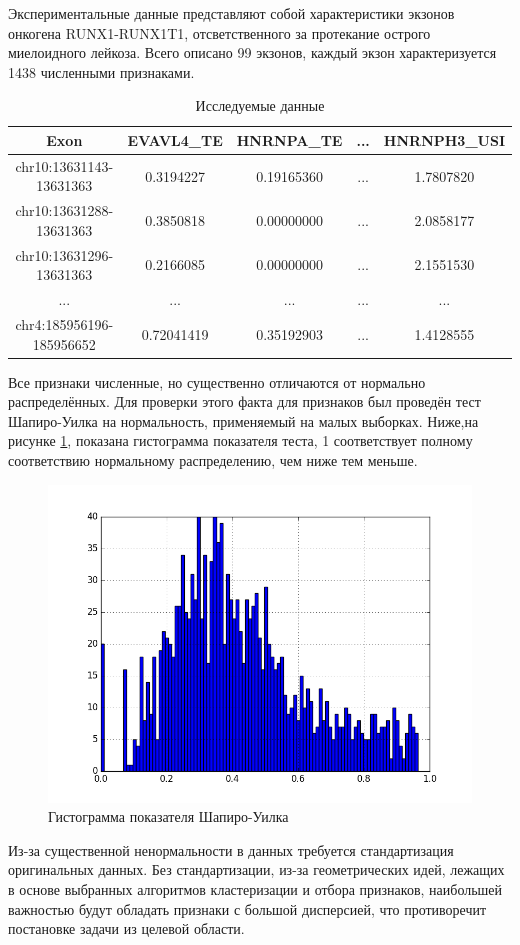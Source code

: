 Экспериментальные данные представляют собой характеристики экзонов онкогена RUNX1-RUNX1T1, отсветственного за протекание острого миелоидного лейкоза. Всего описано 99 экзонов, каждый экзон характеризуется 1438 численными признаками. 
\begin{table}[h]
\center
							\begin{tabular}{|c|c|c|c|c|}
							\hline
							Exon & EVAVL4\_TE & HNRNPA\_TE & ... & HNRNPH3\_USI \\ \hline
							chr10:13631143-13631363 & 0.3194227 & 0.19165360 & ... & 1.7807820 \\ \hline
							chr10:13631288-13631363 & 0.3850818 & 0.00000000 & ... & 2.0858177 \\ \hline
							chr10:13631296-13631363 & 0.2166085 & 0.00000000 & ... & 2.1551530 \\ \hline
							... & ... & ... & ... & ... \\ \hline
							chr4:185956196-185956652 & 0.72041419 & 0.35192903 & ... & 1.4128555 \\ \hline
						\end{tabular}
\caption{Исследуемые данные}
\end{table}

Все признаки численные, но существенно отличаются от нормально распределённых. Для проверки этого факта для признаков был проведён тест Шапиро-Уилка на нормальность, применяемый на малых выборках. Ниже,на рисунке \ref{normality_experimental}, показана гистограмма показателя теста, 1 соответствует полному соответствию нормальному распределению, чем ниже тем меньше.
\begin{figure}[h]
	\center
  \includegraphics[width=0.75\linewidth]{pics/shapiro_experimental.png}
  \caption{Гистограмма показателя Шапиро-Уилка}
  \label{normality_experimental}
\end{figure}

Из-за существенной ненормальности в данных требуется стандартизация оригинальных данных. Без стандартизации, из-за геометрических идей, лежащих в основе выбранных алгоритмов кластеризации и отбора признаков, наибольшей важностью будут обладать признаки с большой дисперсией, что противоречит постановке задачи из целевой области.